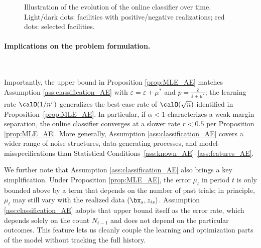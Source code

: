 \documentclass[11pt]{article}
\begin{document}
\begin{figure}[h!]
{
    }
	\caption{Illustration of the evolution of the online classifier over time. Light/dark dots: facilities with positive/negative realizations; red dots: selected facilities.}
    \label{fig:error_AE}
\end{figure}

\paragraph{Implications on the problem formulation.}\

Importantly, the upper bound in Proposition \ref{prop:MLE_AE} matches Assumption \ref{ass:classification_AE} with $\varepsilon = \overline\varepsilon + \mu^*$ and $p=\frac{\overline\varepsilon}{\overline\varepsilon+\mu^*}$; the learning rate $\calO(1/n^r)$ generalizes the best-case rate of $\calO(\sqrt n)$ identified in Proposition~\ref{prop:MLE_AE}. In particular, if $\alpha<1$ characterizes a weak margin separation, the online classifier converges at a slower rate $r<0.5$ per Proposition \ref{prop:MLE_AE}. More generally, Assumption \ref{ass:classification_AE} covers a wider range of noise structures, data-generating processes, and model-misspecifications than Statistical Conditions~\ref{ass:known_AE}–\ref{ass:features_AE}.

We further note that Assumption \ref{ass:classification_AE} also brings a key simplification. Under Proposition \ref{prop:MLE_AE}, the error $\mu_t$ in period $t$ is only bounded above by a term that depends on the number of past trials; in principle, $\mu_t$ may still vary with the realized data $(\bx_s,z_{is})$. Assumption \ref{ass:classification_AE} adopts that upper bound itself as the error rate, which depends solely on the count $N_{t-1}$ and does not depend on the particular outcomes. This feature lets us cleanly couple the learning and optimization parts of the model without tracking the full history.
\end{document}
